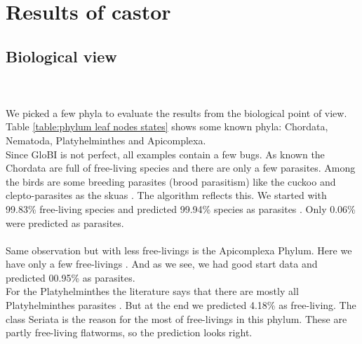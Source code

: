  \section{Results of castor}

    \subsection{Biological view}

       \\ \\

      We picked a few phyla to evaluate the results from the biological point of view. \\
      Table \ref{table:phylum leaf nodes states} shows some known phyla: Chordata, Nematoda, 
        Platyhelminthes and Apicomplexa. \\
      Since GloBI is not perfect, all examples contain a few bugs.
      As known the Chordata are full of free-living species and there are only a few parasites. Among 
        the birds are some breeding parasites (brood parasitism) like the cuckoo and clepto-parasites as 
        the skuas \cite{Rothschild1957}. The algorithm reflects this. We started with 99.83\% 
        free-living species and predicted 99.94\% species as parasites . 
        Only 0.06\% were predicted as parasites. \\
       \\
      Same observation but with less free-livings is the Apicomplexa Phylum. Here we have only a few 
        free-livings . And as we see, we had good start data and predicted 00.95\% as 
        parasites. \\
      For the Platyhelminthes the literature says that there are mostly all Platyhelminthes parasites
        . But at the end we predicted 4.18\% as free-living. The class Seriata is the 
        reason for the most of free-livings in this phylum. These are partly free-living flatworms, so 
        the prediction looks right. \\
      

